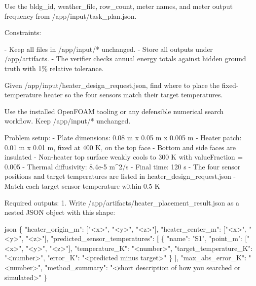 \begin{instructionbox}
Use the \textasciigrave{}bldg\_id\textasciigrave{}, \textasciigrave{}weather\_file\textasciigrave{}, \textasciigrave{}row\_count\textasciigrave{}, meter names, and meter output frequency from \textasciigrave{}/app/input/task\_plan.json\textasciigrave{}.

Constraints:

- Keep all files in \textasciigrave{}/app/input/*\textasciigrave{} unchanged.
- Store all outputs under \textasciigrave{}/app/artifacts\textasciigrave{}.
- The verifier checks annual energy totals against hidden ground truth with \textasciigrave{}1\%\textasciigrave{} relative tolerance.
\end{instructionbox}

\begin{instructionbox}
Given \textasciigrave{}/app/input/heater\_design\_request.json\textasciigrave{}, find where to place the fixed-temperature heater so the four sensors match their target temperatures.

Use the installed OpenFOAM tooling or any defensible numerical search workflow. Keep \textasciigrave{}/app/input/*\textasciigrave{} unchanged.

Problem setup:
- Plate dimensions: \textasciigrave{}0.08 m x 0.05 m x 0.005 m\textasciigrave{}
- Heater patch: \textasciigrave{}0.01 m x 0.01 m\textasciigrave{}, fixed at \textasciigrave{}400 K\textasciigrave{}, on the top face
- Bottom and side faces are insulated
- Non-heater top surface weakly cools to \textasciigrave{}300 K\textasciigrave{} with \textasciigrave{}valueFraction = 0.005\textasciigrave{}
- Thermal diffusivity: \textasciigrave{}8.4e-5 m\textasciicircum{}2/s\textasciigrave{}
- Final time: \textasciigrave{}120 s\textasciigrave{}
- The four sensor positions and target temperatures are listed in \textasciigrave{}heater\_design\_request.json\textasciigrave{}
- Match each target sensor temperature within \textasciigrave{}0.5 K\textasciigrave{}

Required outputs:
1. Write \textasciigrave{}/app/artifacts/heater\_placement\_result.json\textasciigrave{} as a nested JSON object with this shape:

\textasciigrave{}\textasciigrave{}\textasciigrave{}json
\{
  "heater\_origin\_m": ["\textless{}x\textgreater{}", "\textless{}y\textgreater{}", "\textless{}z\textgreater{}"],
  "heater\_center\_m": ["\textless{}x\textgreater{}", "\textless{}y\textgreater{}", "\textless{}z\textgreater{}"],
  "predicted\_sensor\_temperatures": [
    \{
      "name": "S1",
      "point\_m": ["\textless{}x\textgreater{}", "\textless{}y\textgreater{}", "\textless{}z\textgreater{}"],
      "temperature\_K": "\textless{}number\textgreater{}",
      "target\_temperature\_K": "\textless{}number\textgreater{}",
      "error\_K": "\textless{}predicted minus target\textgreater{}"
    \}
  ],
  "max\_abs\_error\_K": "\textless{}number\textgreater{}",
  "method\_summary": "\textless{}short description of how you searched or simulated\textgreater{}"
\}
\textasciigrave{}\textasciigrave{}\textasciigrave{}


\end{instructionbox}
